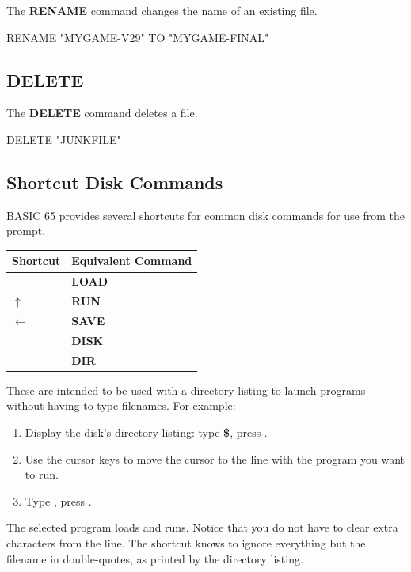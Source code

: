 The {\bf RENAME} command changes the name of an existing file.

\begin{screenoutput}
RENAME "MYGAME-V29" TO "MYGAME-FINAL"
\end{screenoutput}

\subsection{DELETE}

The {\bf DELETE} command deletes a file.

\begin{screenoutput}
DELETE "JUNKFILE"
\end{screenoutput}


\subsection{Shortcut Disk Commands}

BASIC 65 provides several shortcuts for common disk commands for use from the  prompt.

\begin{center}
\begin{tabular}{|l|l|}
\hline
{\bf Shortcut} & {\bf Equivalent Command} \\
\hline
\screentextwide{/} & {\bf LOAD} \\
\hline
$\uparrow$ & {\bf RUN} \\
\hline
$\leftarrow$ & {\bf SAVE} \\
\hline
\screentextwide{@} & {\bf DISK} \\
\hline
\screentextwide{\$} & {\bf DIR} \\
\hline
\end{tabular}
\end{center}

These are intended to be used with a directory listing to launch programs without having to type filenames. For example:

\begin{enumerate}
\item Display the disk's directory listing: type {\bf \$}, press .
\item Use the cursor keys to move the cursor to the line with the program you want to run.
\item Type {\bf \screentext{$\uparrow$}}, press .
\end{enumerate}

The selected program loads and runs. Notice that you do not have to clear extra characters from the line. The shortcut knows to ignore everything but the filename in double-quotes, as printed by the directory listing.
